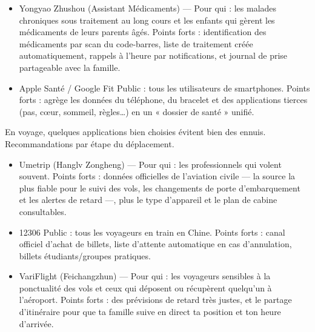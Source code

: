 
\begin{itemize}
  \item Yongyao Zhushou (Assistant Médicaments) — Pour qui : les malades chroniques sous traitement au long cours et les enfants qui gèrent les médicaments de leurs parents âgés. Points forts : identification des médicaments par scan du code-barres, liste de traitement créée automatiquement, rappels à l'heure par notifications, et journal de prise partageable avec la famille.
\end{itemize}


\begin{itemize}
  \item Apple Santé / Google Fit Public : tous les utilisateurs de smartphones. Points forts : agrège les données du téléphone, du bracelet et des applications tierces (pas, cœur, sommeil, règles…) en un « dossier de santé » unifié.
\end{itemize}


En voyage, quelques applications bien choisies évitent bien des ennuis. Recommandations par étape du déplacement.


\begin{itemize}
  \item Umetrip (Hanglv Zongheng) — Pour qui : les professionnels qui volent souvent. Points forts : données officielles de l'aviation civile — la source la plus fiable pour le suivi des vols, les changements de porte d'embarquement et les alertes de retard —, plus le type d'appareil et le plan de cabine consultables.
  \item 12306 Public : tous les voyageurs en train en Chine. Points forts : canal officiel d'achat de billets, liste d'attente automatique en cas d'annulation, billets étudiants/groupes pratiques.
  \item VariFlight (Feichangzhun) — Pour qui : les voyageurs sensibles à la ponctualité des vols et ceux qui déposent ou récupèrent quelqu'un à l'aéroport. Points forts : des prévisions de retard très justes, et le partage d'itinéraire pour que ta famille suive en direct ta position et ton heure d'arrivée.
\end{itemize}


